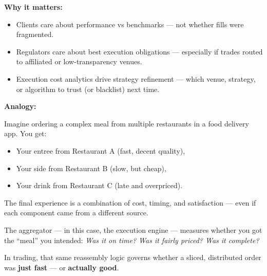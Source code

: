 \textbf{Why it matters:}

\begin{itemize}
  \item Clients care about performance vs benchmarks — not whether fills were fragmented.
  \item Regulators care about best execution obligations — especially if trades routed to affiliated or 
  low-transparency venues.
  \item Execution cost analytics drive strategy refinement — which venue, strategy, or algorithm to trust 
  (or blacklist) next time.
\end{itemize}

\textbf{Analogy:}

Imagine ordering a complex meal from multiple restaurants in a food delivery app. You get:

\begin{itemize}
  \item Your entree from Restaurant A (fast, decent quality),
  \item Your side from Restaurant B (slow, but cheap),
  \item Your drink from Restaurant C (late and overpriced).
\end{itemize}

The final experience is a combination of cost, timing, and satisfaction — even if each component came 
from a different source.

The aggregator — in this case, the execution engine — measures whether you got the “meal” you intended:
\textit{Was it on time? Was it fairly priced? Was it complete?}

In trading, that same reassembly logic governs whether a sliced, distributed order was \textbf{just fast} — 
or \textbf{actually good}.


